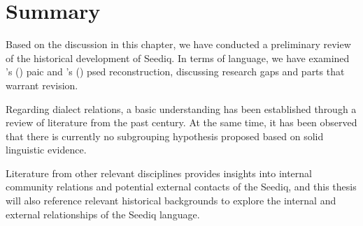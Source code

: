 \section{Summary} \label{sec:ch2_sum}

Based on the discussion in this chapter, we have conducted a preliminary review of the historical development of Seediq. In terms of language, we have examined \citeauthor{li1981paic}'s (\citeyear{li1981paic}) \acl{paic} and \citeauthor{ochiai2016buhwan}'s (\citeyear{ochiai2016buhwan}) \acl{psed} reconstruction, discussing research gaps and parts that warrant revision. 

Regarding dialect relations, a basic understanding has been established through a review of literature from the past century. At the same time, it has been observed that there is currently no subgrouping hypothesis proposed based on solid linguistic evidence.

Literature from other relevant disciplines provides insights into internal community relations and potential external contacts of the Seediq, and this thesis will also reference relevant historical backgrounds to explore the internal and external relationships of the Seediq language.
